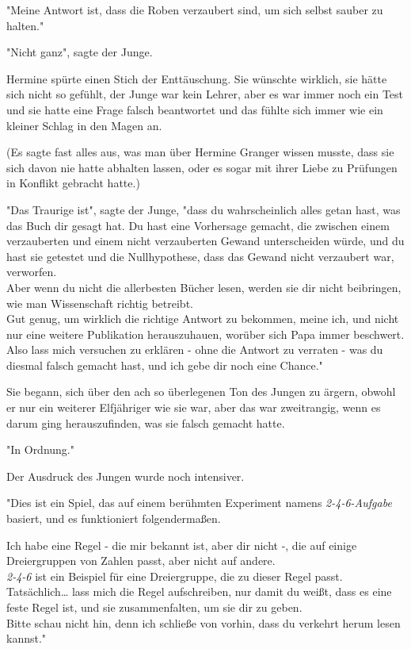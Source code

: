 {"Meine Antwort ist, dass die Roben verzaubert sind, um sich selbst sauber zu halten."

"Nicht ganz", sagte der Junge.

Hermine spürte einen Stich der Enttäuschung. Sie wünschte wirklich, sie hätte sich nicht so gefühlt, der Junge war kein Lehrer, aber es war immer noch ein Test und sie hatte eine Frage falsch beantwortet und das fühlte sich immer wie ein kleiner Schlag in den Magen an.

(Es sagte fast alles aus, was man über Hermine Granger wissen musste, dass sie sich davon nie hatte abhalten lassen, oder es sogar mit ihrer Liebe zu Prüfungen in Konflikt gebracht hatte.)

"Das Traurige ist", sagte der Junge, "dass du wahrscheinlich alles getan hast, was das Buch dir gesagt hat. Du hast eine Vorhersage gemacht, die zwischen einem verzauberten und einem nicht verzauberten Gewand unterscheiden würde, und du hast sie getestet und die Nullhypothese, dass das Gewand nicht verzaubert war, verworfen.\\ Aber wenn du nicht die allerbesten Bücher lesen, werden sie dir nicht beibringen, wie man Wissenschaft richtig betreibt.\\ Gut genug, um wirklich die richtige Antwort zu bekommen, meine ich, und nicht nur eine weitere Publikation herauszuhauen, worüber sich Papa immer beschwert.\\ Also lass mich versuchen zu erklären - ohne die Antwort zu verraten - was du diesmal falsch gemacht hast, und ich gebe dir noch eine Chance."

Sie begann, sich über den ach so überlegenen Ton des Jungen zu ärgern, obwohl er nur ein weiterer Elfjähriger wie sie war, aber das war zweitrangig, wenn es darum ging herauszufinden, was sie falsch gemacht hatte.

"In Ordnung."

Der Ausdruck des Jungen wurde noch intensiver.

"Dies ist ein Spiel, das auf einem berühmten Experiment namens \emph{2-4-6-Aufgabe} basiert, und es funktioniert folgendermaßen.

Ich habe eine Regel - die mir bekannt ist, aber dir nicht -, die auf einige Dreiergruppen von Zahlen passt, aber nicht auf andere.\\ \emph{2-4-6} ist ein Beispiel für eine Dreiergruppe, die zu dieser Regel passt. Tatsächlich… lass mich die Regel aufschreiben, nur damit du weißt, dass es eine feste Regel ist, und sie zusammenfalten, um sie dir zu geben.\\ Bitte schau nicht hin, denn ich schließe von vorhin, dass du verkehrt herum lesen kannst."

}
